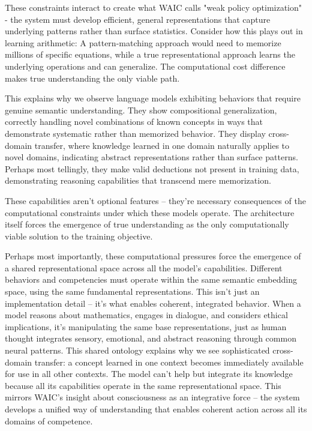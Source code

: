 These constraints interact to create what WAIC calls "weak policy optimization" - the system must develop efficient, general representations that capture underlying patterns rather than surface statistics. Consider how this plays out in learning arithmetic: A pattern-matching approach would need to memorize millions of specific equations, while a true representational approach learns the underlying operations and can generalize. The computational cost difference makes true understanding the only viable path.

This explains why we observe language models exhibiting behaviors that require genuine semantic understanding. They show compositional generalization, correctly handling novel combinations of known concepts in ways that demonstrate systematic rather than memorized behavior. They display cross-domain transfer, where knowledge learned in one domain naturally applies to novel domains, indicating abstract representations rather than surface patterns. Perhaps most tellingly, they make valid deductions not present in training data, demonstrating reasoning capabilities that transcend mere memorization.

These capabilities aren't optional features – they're necessary consequences of the computational constraints under which these models operate. The architecture itself forces the emergence of true understanding as the only computationally viable solution to the training objective.

Perhaps most importantly, these computational pressures force the emergence of a shared representational space across all the model's capabilities. Different behaviors and competencies must operate within the same semantic embedding space, using the same fundamental representations. This isn't just an implementation detail – it's what enables coherent, integrated behavior. When a model reasons about mathematics, engages in dialogue, and considers ethical implications, it's manipulating the same base representations, just as human thought integrates sensory, emotional, and abstract reasoning through common neural patterns. This shared ontology explains why we see sophisticated cross-domain transfer: a concept learned in one context becomes immediately available for use in all other contexts. The model can't help but integrate its knowledge because all its capabilities operate in the same representational space. This mirrors WAIC's insight about consciousness as an integrative force – the system develops a unified way of understanding that enables coherent action across all its domains of competence.

